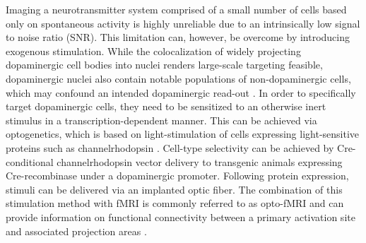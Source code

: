 Imaging a neurotransmitter system comprised of a small number of cells based only on spontaneous activity is highly unreliable due to an intrinsically low signal to noise ratio (SNR).
This limitation can, however, be overcome by introducing exogenous stimulation.
While the colocalization of widely projecting dopaminergic cell bodies into nuclei renders large-scale targeting feasible, dopaminergic nuclei also contain notable populations of non-dopaminergic cells, which may confound an intended dopaminergic read-out \cite{Taylor2014}.
In order to specifically target dopaminergic cells, they need to be sensitized to an otherwise inert stimulus in a transcription-dependent manner.
This can be achieved via optogenetics, which is based on light-stimulation of cells expressing light-sensitive proteins such as channelrhodopsin \cite{Boyden2005}.
Cell-type selectivity can be achieved by Cre-conditional channelrhodopsin vector delivery \cite{Orban1992} to transgenic animals expressing Cre-recombinase under a dopaminergic promoter.
Following protein expression, stimuli can be delivered via an implanted optic fiber.
The combination of this stimulation method with fMRI is commonly referred to as opto-fMRI and can provide information on functional connectivity between a primary activation site and associated projection areas \cite{Desai2011,Grandjean2019}.



